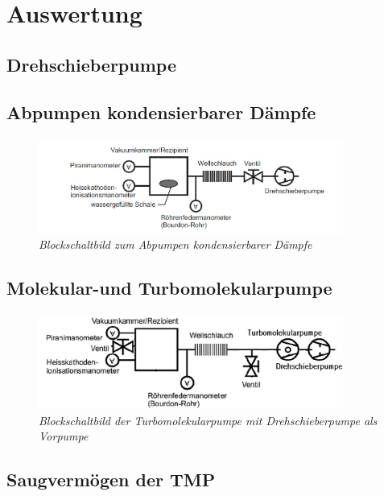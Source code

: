 \section{Auswertung}
\subsection{Drehschieberpumpe}



\subsection{Abpumpen kondensierbarer Dämpfe}
\begin{figure}[h]
	\includegraphics[width=100mm]{Dampf}
	\centering
	\caption{\itshape Blockschaltbild zum Abpumpen kondensierbarer Dämpfe}
	\label{fig:1}
\end{figure}
\noindent

\subsection{Molekular-und Turbomolekularpumpe}
\begin{figure}[h]
	\includegraphics[width=100mm]{TMPmitVorpumpe}
	\centering
	\caption{\itshape Blockschaltbild der Turbomolekularpumpe mit Drehschieberpumpe als Vorpumpe}
	\label{fig:2}
\end{figure}
\noindent

\subsection{Saugvermögen der TMP}

